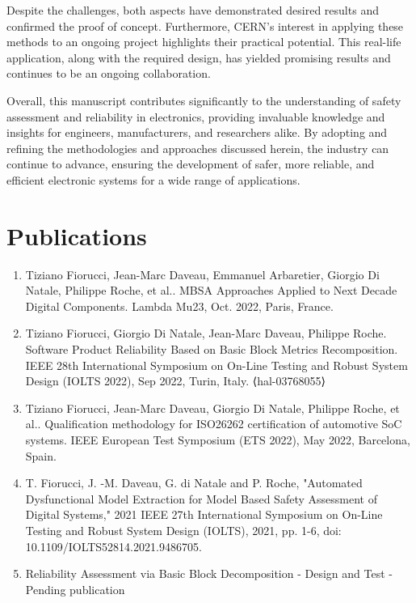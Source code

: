 \documentclass[./dissertation.tex]{subfiles}
\begin{document}
Despite the challenges, both aspects have demonstrated desired results and confirmed the proof of concept. Furthermore, CERN's interest in applying these methods to an ongoing project highlights their practical potential. This real-life application, along with the required design, has yielded promising results and continues to be an ongoing collaboration.

Overall, this manuscript contributes significantly to the understanding of safety assessment and reliability in electronics, providing invaluable knowledge and insights for engineers, manufacturers, and researchers alike. By adopting and refining the methodologies and approaches discussed herein, the industry can continue to advance, ensuring the development of safer, more reliable, and efficient electronic systems for a wide range of applications.



\section{Publications}

\begin{enumerate}
    \item Tiziano Fiorucci, Jean-Marc Daveau, Emmanuel Arbaretier, Giorgio Di Natale, Philippe Roche, et al.. MBSA Approaches Applied to Next Decade Digital Components. Lambda Mu23, Oct. 2022, Paris, France. 
    \item Tiziano Fiorucci, Giorgio Di Natale, Jean-Marc Daveau, Philippe Roche. Software Product Reliability Based on Basic Block Metrics Recomposition. IEEE 28th International Symposium on On-Line Testing and Robust System Design (IOLTS 2022), Sep 2022, Turin, Italy. ⟨hal-03768055⟩ 
    \item Tiziano Fiorucci, Jean-Marc Daveau, Giorgio Di Natale, Philippe Roche, et al.. Qualification methodology for ISO26262 certification of automotive SoC systems. IEEE European Test Symposium (ETS 2022), May 2022, Barcelona, Spain.
    \item T. Fiorucci, J. -M. Daveau, G. di Natale and P. Roche, "Automated Dysfunctional Model Extraction for Model Based
Safety Assessment of Digital Systems," 2021 IEEE 27th International Symposium on On-Line Testing and Robust
System Design (IOLTS), 2021, pp. 1-6, doi: 10.1109/IOLTS52814.2021.9486705.
    \item Reliability Assessment via Basic Block Decomposition - Design and Test - Pending publication
\end{enumerate}
\newpage	
\end{document}
